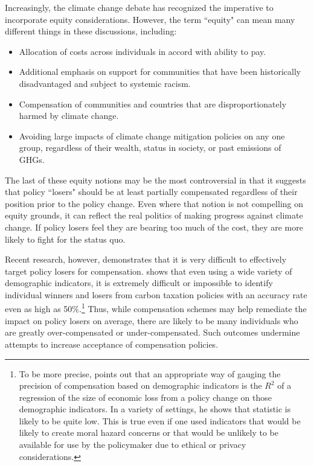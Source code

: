 \documentclass[12pt]{article}
\begin{document}
Increasingly, the climate change debate has recognized the imperative to incorporate equity considerations. However, the term ``equity" can mean many different things in these discussions, including:  
\begin{itemize}

\item Allocation of costs across individuals in accord with ability to pay. 

\item Additional emphasis on support for communities that have been historically disadvantaged and subject to systemic racism. 

\item Compensation of communities and countries that are disproportionately harmed by climate change.  

\item Avoiding large impacts of climate change mitigation policies on any one group, regardless of their wealth, status in society, or past emissions of GHGs.
\end{itemize}

The last of these equity notions may be the most controversial in that it suggests that policy ``losers" should be at least partially compensated regardless of their position prior to the policy change.  Even where that notion is not compelling on equity grounds, it can reflect the real politics of making progress against climate change. If policy losers feel they are bearing too much of the cost, they are more likely to fight for the status quo.

Recent research, however, demonstrates that it is very difficult to effectively target policy losers for compensation. \cite{sallee2019pigou} shows that even using a wide variety of demographic indicators, it is extremely difficult or impossible to identify individual winners and losers from carbon taxation policies with an accuracy rate even as high as 50\%.\footnote{To be more precise, \cite{sallee2019pigou} points out that an appropriate way of gauging the precision of compensation based on demographic indicators is the $R^2$ of a regression of the size of economic loss from a policy change on those demographic indicators. In a variety of settings, he shows that statistic is likely to be quite low.  This is true even if one used indicators that would be likely to create moral hazard concerns or that would be unlikely to be available for use by the policymaker due to ethical or privacy considerations.}  Thus, while compensation schemes may help remediate the impact on policy losers on average, there are likely to be many individuals who are greatly over-compensated or under-compensated. Such outcomes undermine attempts to increase acceptance of compensation policies.
\end{document}
